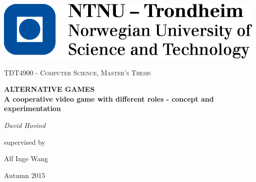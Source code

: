 \begin{titlepage}
	\includegraphics[]{images/ntnu_logo}\par\vspace{1.5cm}
	\centering
	{\scshape\Large TDT4900 - Computer Science, Master's Thesis\par}
	\vspace{1.5cm}
	{\huge\bfseries \uppercase{Alternative games} \\ 
	\Large A cooperative video game with different roles - concept and experimentation\par}
	\vspace{2cm}
	{\Large\itshape David Hovind\par}
	\vfill
	supervised by\par
	Alf Inge Wang
	
	\vfill
	
	{\large Autumn 2015}
\end{titlepage}
